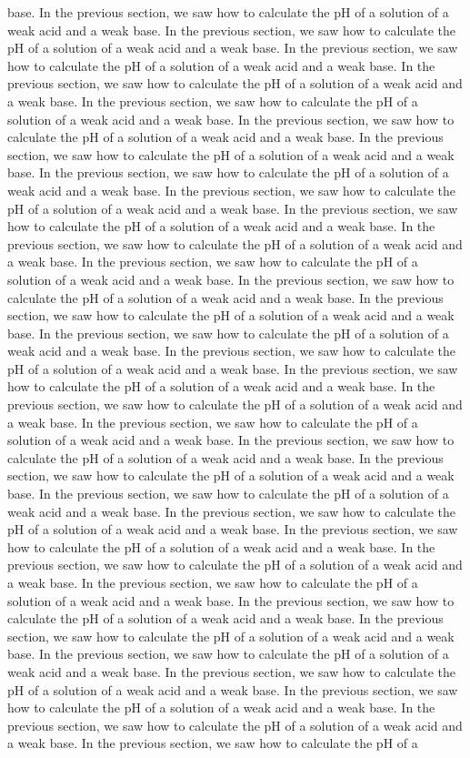 \documentclass[11pt]{article}
\begin{document}
base. In the previous section, we saw how to calculate the pH of a solution of a weak acid and a weak base. In the previous section, we saw how to calculate the pH of a solution of a weak acid and a weak base. In the previous section, we saw how to calculate the pH of a solution of a weak acid and a weak base. In the previous section, we saw how to calculate the pH of a solution of a weak acid and a weak base. In the previous section, we saw how to calculate the pH of a solution of a weak acid and a weak base. In the previous section, we saw how to calculate the pH of a solution of a weak acid and a weak base. In the previous section, we saw how to calculate the pH of a solution of a weak acid and a weak base. In the previous section, we saw how to calculate the pH of a solution of a weak acid and a weak base. In the previous section, we saw how to calculate the pH of a solution of a weak acid and a weak base. In the previous section, we saw how to calculate the pH of a solution of a weak acid and a weak base. In the previous section, we saw how to calculate the pH of a solution of a weak acid and a weak base. In the previous section, we saw how to calculate the pH of a solution of a weak acid and a weak base. In the previous section, we saw how to calculate the pH of a solution of a weak acid and a weak base. In the previous section, we saw how to calculate the pH of a solution of a weak acid and a weak base. In the previous section, we saw how to calculate the pH of a solution of a weak acid and a weak base. In the previous section, we saw how to calculate the pH of a solution of a weak acid and a weak base. In the previous section, we saw how to calculate the pH of a solution of a weak acid and a weak base. In the previous section, we saw how to calculate the pH of a solution of a weak acid and a weak base. In the previous section, we saw how to calculate the pH of a solution of a weak acid and a weak base. In the previous section, we saw how to calculate the pH of a solution of a weak acid and a weak base. In the previous section, we saw how to calculate the pH of a solution of a weak acid and a weak base. In the previous section, we saw how to calculate the pH of a solution of a weak acid and a weak base. In the previous section, we saw how to calculate the pH of a solution of a weak acid and a weak base. In the previous section, we saw how to calculate the pH of a solution of a weak acid and a weak base. In the previous section, we saw how to calculate the pH of a solution of a weak acid and a weak base. In the previous section, we saw how to calculate the pH of a solution of a weak acid and a weak base. In the previous section, we saw how to calculate the pH of a solution of a weak acid and a weak base. In the previous section, we saw how to calculate the pH of a solution of a weak acid and a weak base. In the previous section, we saw how to calculate the pH of a solution of a weak acid and a weak base. In the previous section, we saw how to calculate the pH of a solution of a weak acid and a weak base. In the previous section, we saw how to calculate the pH of a solution of a weak acid and a weak base. In the previous section, we saw how to calculate the pH of a solution of a weak acid and a weak base. In the previous section, we saw how to calculate the pH of a 
\end{document}
